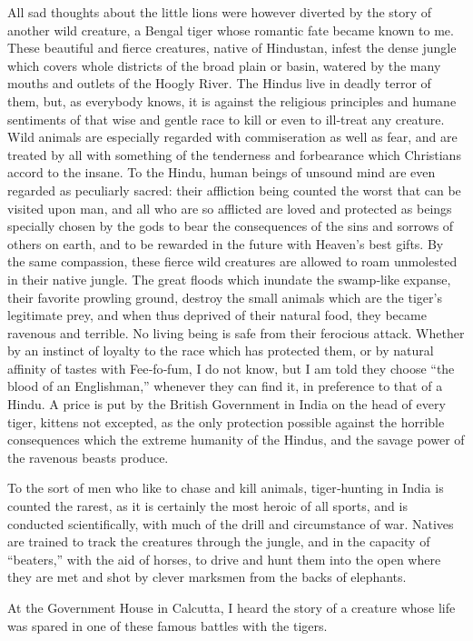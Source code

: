 \documentclass[12pt]{book}
\begin{document}
All sad thoughts about the little lions were however diverted by the story
of another wild creature, a Bengal tiger whose romantic fate became known to
me. These beautiful and fierce creatures, native of Hindustan, infest the dense
jungle which covers whole districts of the broad plain or basin, watered by the
many mouths and outlets of the Hoogly River. The Hindus live in deadly terror of
them, but, as everybody knows, it is against the religious principles and humane
sentiments of that wise and gentle race to kill or even to ill‐treat any creature.
Wild animals are especially regarded with commiseration as well as fear, and are
treated by all with something of the tenderness and forbearance which Christians
accord to the insane. To the Hindu, human beings of unsound mind are even
regarded as peculiarly sacred: their affliction being counted the worst that can
be visited upon man, and all who are so afflicted are loved and protected as
beings specially chosen by the gods to bear the consequences of the sins and
sorrows of others on earth, and to be rewarded in the future with Heaven’s best
gifts. By the same compassion, these fierce wild creatures are allowed to roam
unmolested in their native jungle. The great floods which inundate the swamp‐like
expanse, their favorite prowling ground, destroy the small animals which are
the tiger’s legitimate prey, and when thus deprived of their natural food, they
became ravenous and terrible. No living being is safe from their ferocious attack.
Whether by an instinct of loyalty to the race which has protected them, or by
natural affinity of tastes with Fee‐fo‐fum, I do not know, but I am told they choose
“the blood of an Englishman,” whenever they can find it, in preference to that of a
Hindu. A price is put by the British Government in India on the head of every
tiger, kittens not excepted, as the only protection possible against the horrible
consequences which the extreme humanity of the Hindus, and the savage power
of the ravenous beasts produce.

To the sort of men who like to chase and kill animals, tiger‐hunting in India is
counted the rarest, as it is certainly the most heroic of all sports, and is conducted
scientifically, with much of the drill and circumstance of war. Natives are trained
to track the creatures through the jungle, and in the capacity of “beaters,” with
the aid of horses, to drive and hunt them into the open where they are met and
shot by clever marksmen from the backs of elephants.

At the Government House in Calcutta, I heard the story of a creature whose
life was spared in one of these famous battles with the tigers.
\end{document}
